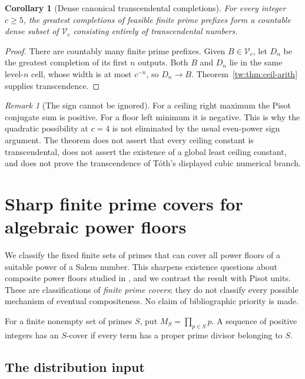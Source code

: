 \documentclass[11pt,a4paper]{article}
\newtheorem{corollary}[theorem]{Corollary}
\theoremstyle{definition}
\theoremstyle{remark}
\newtheorem{remark}[theorem]{Remark}
\numberwithin{equation}{section}
\begin{document}
\begin{corollary}[Dense canonical transcendental completions]
For every integer $c\geq5$, the greatest completions of feasible finite
prime prefixes form a countable dense subset of $\mathcal V_c$ consisting
entirely of transcendental numbers.
\end{corollary}

\begin{proof}
There are countably many finite prime prefixes. Given $B\in\mathcal V_c$,
let $D_n$ be the greatest completion of its first $n$ outputs. Both $B$
and $D_n$ lie in the same level-$n$ cell, whose width is at most $c^{-n}$,
so $D_n\to B$. Theorem~\ref{tw:thm:ceil-arith} supplies transcendence.
\end{proof}

\begin{remark}[The sign cannot be ignored]
For a ceiling right maximum the Pisot conjugate sum is positive.
For a floor left minimum it is negative. This is why the quadratic
possibility at $c=4$ is not eliminated by the usual even-power sign
argument. The theorem does not assert that every ceiling constant is
transcendental, does not assert the existence of a global least ceiling
constant, and does not prove the transcendence of T\'oth's displayed
cubic numerical branch.
\end{remark}


\section{Sharp finite prime covers for algebraic power floors}
\label{tw:sec:sharp-prime-covers}

We classify the fixed finite sets of primes that can cover all power
floors of a suitable power of a Salem number. This sharpens existence
questions about composite power floors studied in
\cite{Dubickas2006,SaitoIntervals,HIKK2026}, and we contrast the result
with Pisot units.  These are classifications of \emph{finite prime covers};
they do not classify every possible mechanism of eventual compositeness.
No claim of bibliographic priority is made.

For a finite nonempty set of primes $S$, put $M_S=\prod_{p\in S}p$.
A sequence of positive integers has an $S$-cover if every term has a
proper prime divisor belonging to $S$.

\subsection{The distribution input}
\end{document}
